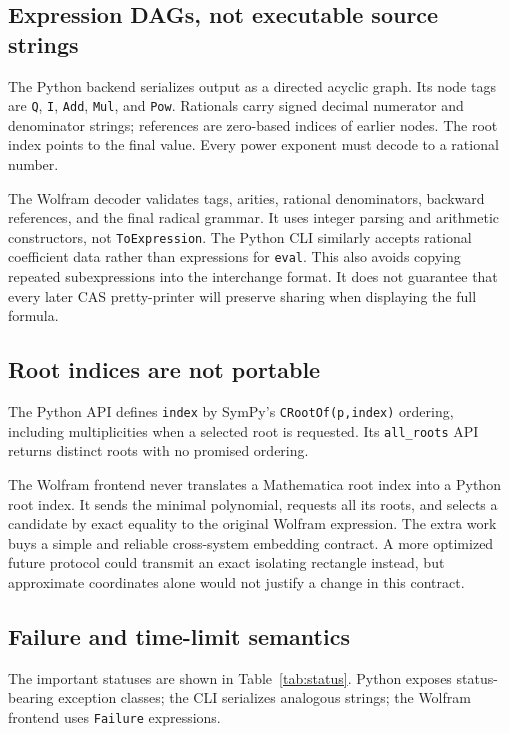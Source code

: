 \documentclass[11pt]{article}
\theoremstyle{definition}\newtheorem{definition}[theorem]{Definition}
\theoremstyle{remark}\newtheorem{remark}[theorem]{Remark}
\newcommand{\code}[1]{\texttt{#1}}
\begin{document}
\subsection{Expression DAGs, not executable source strings}

The Python backend serializes output as a directed acyclic graph. Its node
tags are \code{Q}, \code{I}, \code{Add}, \code{Mul}, and \code{Pow}. Rationals
carry signed decimal numerator and denominator strings; references are
zero-based indices of earlier nodes. The root index points to the final value.
Every power exponent must decode to a rational number.

The Wolfram decoder validates tags, arities, rational denominators, backward
references, and the final radical grammar. It uses integer parsing and
arithmetic constructors, not \code{ToExpression}. The Python CLI similarly
accepts rational coefficient data rather than expressions for \code{eval}.
This also avoids copying repeated subexpressions into the interchange format.
It does not guarantee that every later CAS pretty-printer will preserve
sharing when displaying the full formula.

\subsection{Root indices are not portable}

The Python API defines \code{index} by SymPy's \code{CRootOf(p,index)} ordering,
including multiplicities when a selected root is requested. Its
\code{all\_roots} API returns distinct roots with no promised ordering.

The Wolfram frontend never translates a Mathematica root index into a Python
root index. It sends the minimal polynomial, requests all its roots, and selects
a candidate by exact equality to the original Wolfram expression. The extra
work buys a simple and reliable cross-system embedding contract. A more
optimized future protocol could transmit an exact isolating rectangle instead,
but approximate coordinates alone would not justify a change in this contract.

\subsection{Failure and time-limit semantics}

The important statuses are shown in Table~\ref{tab:status}. Python exposes
status-bearing exception classes; the CLI serializes analogous strings; the
Wolfram frontend uses \code{Failure} expressions.
\end{document}
